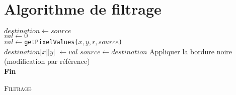 \documentclass[a4paper, 11pt]{article}
\begin{document}
\section*{Algorithme de filtrage}
\begin{minipage}[t]{0.5\linewidth}
\strut\vspace*{-\baselineskip}\newline
\begin{algorithm}[H]
    $destination \gets source$\\
    $val \gets 0$\\
    
      {
      	  {
      	    {
    			$val \gets $\texttt{getPixelValues(}$x, y, r, source$\texttt{)}\\
    			$destination$[$x$][$y$] $\gets val$
      	    }
      	 }
      $source \gets destination$
      }
      Appliquer la bordure noire (modification par référence)\\
       \textbf{Fin}
\caption{ \textsc{Filtrage}}
\end{algorithm}
\end{minipage}
\end{document}
